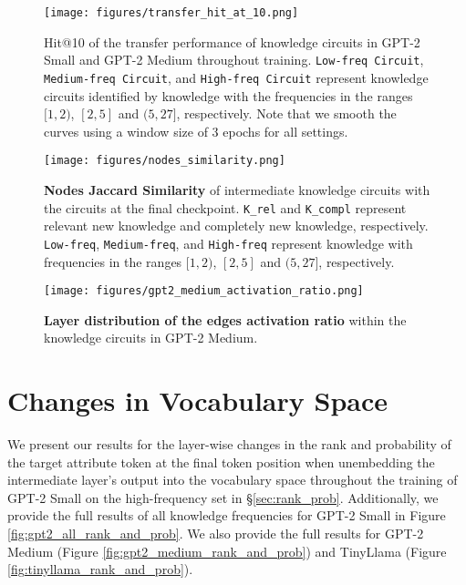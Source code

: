 \begin{figure*}
    \centering
    \texttt{[image: figures/transfer\_hit\_at\_10.png]}
    \caption{Hit@10 of the transfer performance of knowledge circuits in GPT-2 Small and GPT-2 Medium throughout training. \textcolor[RGB]{44,160,44}{\texttt{Low-freq Circuit}}, \textcolor[RGB]{255,127,14}{\texttt{Medium-freq Circuit}}, and \textcolor[RGB]{31,119,180}{\texttt{High-freq Circuit}} represent knowledge circuits identified by knowledge with the frequencies in the ranges  \textcolor[RGB]{44,160,44}{$[1, 2)$}, \textcolor[RGB]{255,127,14}{$[2,5]$} and \textcolor[RGB]{31,119,180}{$(5, 27]$}, respectively. Note that we smooth the curves using a window size of 3 epochs for all settings.}
    \label{fig:transfer_hit_at_10}
\end{figure*}

\begin{figure*}
    \centering
    \texttt{[image: figures/nodes\_similarity.png]}
    \caption{\textbf{Nodes Jaccard Similarity} of intermediate knowledge circuits with the circuits at the final checkpoint. \texttt{K\_rel} and \texttt{K\_compl} represent relevant new knowledge and completely new knowledge, respectively. \texttt{Low-freq}, \texttt{Medium-freq}, and \texttt{High-freq} represent knowledge with frequencies in the ranges $[1, 2)$, $[2,5]$ and $(5, 27]$, respectively.}
    \label{fig:nodes_similarity}
\end{figure*}

\begin{figure}
    \centering
    \texttt{[image: figures/gpt2\_medium\_activation\_ratio.png]}
    \caption{\textbf{Layer distribution of the edges activation ratio} within the knowledge circuits in GPT-2 Medium.}
    \label{fig:gpt2_medium_activation_ratio}
    \vspace{-10pt}
\end{figure}

\section{Changes in Vocabulary Space}
\label{app:rank_prob}

We present our results for the layer-wise changes in the rank and probability of the target attribute token at the final token position when unembedding the intermediate layer’s output into the vocabulary space throughout the training of GPT-2 Small on the high-frequency set in \S\ref{sec:rank_prob}.
Additionally, we provide the full results of all knowledge frequencies for GPT-2 Small in Figure \ref{fig:gpt2_all_rank_and_prob}.
We also provide the full results for GPT-2 Medium (Figure \ref{fig:gpt2_medium_rank_and_prob}) and TinyLlama (Figure \ref{fig:tinyllama_rank_and_prob}).

